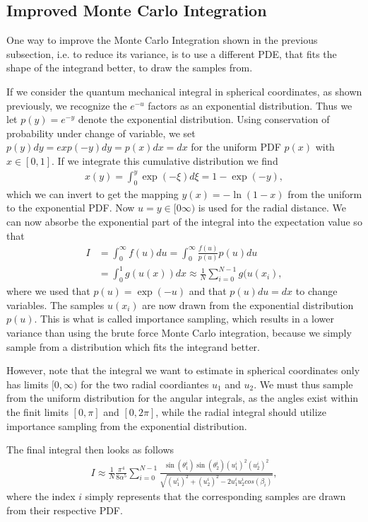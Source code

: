 \documentclass[10pt, twocolumn]{aastex62}
\begin{document}
\subsection{Improved Monte Carlo Integration}\label{subsec:improved_monte_carlo}
One way to improve the Monte Carlo Integration shown in the previous subsection,
i.e. to reduce its variance, is to use a different PDE, that fits the shape of
the integrand better, to draw the samples from.

If we consider the quantum mechanical integral in spherical coordinates, as
shown previously, we recognize the $e^{-u}$ factors as an exponential
distribution. Thus we let $p(y) = e^{-y}$ denote the exponential distribution.
Using conservation of probability under change of variable, we set $p(y)dy =
exp(-y)dy = p(x)dx = dx$ for the uniform PDF $p(x)$ with $x\in[0,1]$. If we
integrate this cumulative distribution we find 
\begin{align}
	x(y) = \int^y_0 \exp(-\xi)d\xi = 1 - \exp(-y),
\end{align} 
which we can invert to get the mapping $y(x) = -\ln(1-x)$ from the uniform to
the exponential PDF. Now $u = y\in[0\infty)$ is used for the radial distance. We
can now absorbe the exponential part of the integral into the expectation value
so that 
\begin{align}
	I &= \int^\infty_0 f(u)du = \int_0^\infty \frac{f(u)}{p(u)}p(u)du \\
	&= \int^1_0 g(u(x))dx \approx \frac{1}{N}\sum_{i=0}^{N-1} g(u(x_i), 
\end{align}
where we used that $p(u) = \exp(-u)$ and that $p(u)du = dx$ to change variables.
The samples $u(x_i)$ are now drawn from the exponential distribution $p(u)$.
This is what is called importance sampling, which results in a lower variance
than using the brute force Monte Carlo integration, because we simply sample
from a distribution which fits the integrand better. 

However, note that the integral we want to estimate in spherical coordinates
only has limits $[0, \infty)$ for the two radial coordiantes $u_1$ and $u_2$. We
must thus sample from the uniform distribution for the angular integrals, as the
angles exist within the finit limits $[0,\pi]$ and $[0, 2\pi]$, while the radial
integral should utilize importance sampling from the exponential distribution.

The final integral then looks as follows
\begin{align}
	I \approx \frac{1}{N}\frac{\pi^4}{8\alpha^5}\sum^{N-1}_{i=0}\frac{\sin
	(\theta_1^i)\sin(\theta_2^i)(u_1^i)^2(u_2^i)^2}{\sqrt{(u_1^i)^2 + (u_2^i)^2 - 2u_1^iu_2^icos(\beta_i)}},
\end{align}
where the index $i$ simply represents that the corresponding samples are drawn
from their respective PDF.
\end{document}
